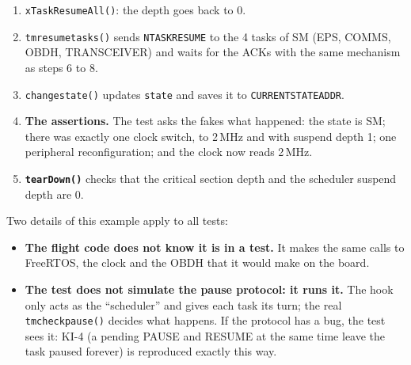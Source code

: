 \documentclass[11pt,a4paper]{article}
\DeclareRobustCommand{\_}{\textunderscore\allowbreak}
\newcommand{\cd}[1]{\texttt{#1}}
\begin{document}
\begin{enumerate}[label=\textbf{\arabic*.}]
  \cd{fake\_clock} counts the calls and records what the suspend depth was at the
  moment of the switch.
\item \cd{xTaskResumeAll()}: the depth goes back to 0.
\item \cd{tm\_resume\_tasks()} sends \cd{N\_TASK\_RESUME} to the 4 tasks of SM (EPS, COMMS,
  OBDH, TRANSCEIVER) and waits for the ACKs with the same mechanism as steps 6 to 8.
\item \cd{change\_state()} updates \cd{state} and saves it to \cd{CURRENT\_STATE\_ADDR}.
\item \textbf{The assertions.} The test asks the fakes what happened: the state is SM;
  there was exactly one clock switch, to 2\,MHz and with suspend depth 1;
  one peripheral reconfiguration; and the clock now reads 2\,MHz.
\item \textbf{\cd{tearDown()}} checks that the critical section depth and the scheduler
  suspend depth are 0.
\end{enumerate}

Two details of this example apply to all tests:
\begin{itemize}
\item \textbf{The flight code does not know it is in a test.} It makes the same calls to
  FreeRTOS, the clock and the OBDH that it would make on the board.
\item \textbf{The test does not simulate the pause protocol: it runs it.} The hook only acts as the
  ``scheduler'' and gives each task its turn; the real
  \cd{tm\_check\_pause()} decides what happens. If the protocol has a bug, the test sees it: KI-4 (a pending PAUSE and
  RESUME at the same time leave the task paused forever) is reproduced exactly this way.
\end{itemize}
\end{document}
